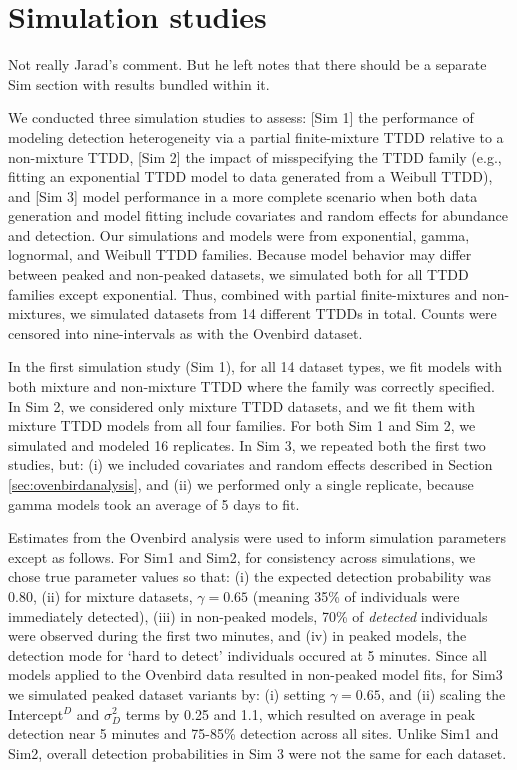 \documentclass[useAMS,usenatbib,referee,12pt]{article}
\newcommand{\jarad}[1]{{\color{Orange} #1}}
\begin{document}
\section{Simulation studies}

\jarad{Not really Jarad's comment.  But he left notes that there should be a separate Sim section with results bundled within it.}

We conducted three simulation studies to assess: [Sim 1] the performance of modeling detection heterogeneity via a partial finite-mixture TTDD relative to a non-mixture TTDD, [Sim 2] the impact of misspecifying the TTDD family (e.g., fitting an exponential TTDD model to data generated from a Weibull TTDD), and [Sim 3] model performance in a more complete scenario when both data generation and model fitting include covariates and random effects for abundance and detection.  
Our simulations and models were from exponential, gamma, lognormal, and Weibull TTDD families.  
Because model behavior may differ between peaked and non-peaked datasets, we simulated both for all TTDD families except exponential.  
Thus, combined with partial finite-mixtures and non-mixtures, we simulated datasets from 14 different TTDDs in total.  
Counts were censored into nine-intervals as with the Ovenbird dataset.

In the first simulation study (Sim 1), for all 14 dataset types, we fit models with both mixture and non-mixture TTDD where the family was correctly specified.  
In Sim 2, we considered only mixture TTDD datasets, and we fit them with mixture TTDD models from all four families.  
For both Sim 1 and Sim 2, we simulated and modeled 16 replicates.  
In Sim 3, we repeated both the first two studies, but: (i) we included covariates and random effects described in Section \ref{sec:ovenbirdanalysis}, and (ii) we performed only a single replicate, because gamma models took an average of 5 days to fit.

Estimates from the Ovenbird analysis were used to inform simulation parameters except as follows.  
For Sim1 and Sim2, for consistency across simulations, we chose true parameter values so that: (i) the expected detection probability was 0.80, (ii) for mixture datasets, $\gamma = 0.65$ (meaning 35\% of individuals were immediately detected), (iii) in non-peaked models, 70\% of \textit{detected} individuals were observed during the first two minutes, and (iv) in peaked models, the detection mode for `hard to detect' individuals occured at 5 minutes.  
Since all models applied to the Ovenbird data resulted in non-peaked model fits, for Sim3 we simulated peaked dataset variants by:  (i) setting $\gamma = 0.65$, and (ii) scaling the Intercept$^D$ and $\sigma_D^2$ terms by 0.25 and 1.1, which resulted on average in peak detection near 5 minutes and 75-85\% detection across all sites.  
Unlike Sim1 and Sim2, overall detection probabilities in Sim 3 were not the same for each dataset.
\end{document}
